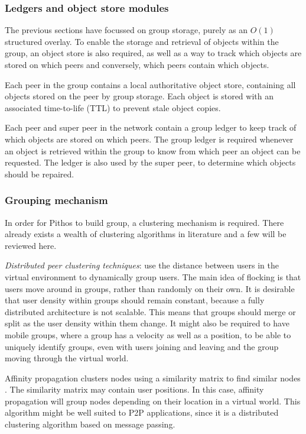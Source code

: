 \subsubsection{Ledgers and object store modules}

The previous sections have focussed on group storage, purely as an $O(1)$ structured overlay. To enable the storage and retrieval of objects within the group, an object store is also required, as well as a way to track which objects are stored on which peers and conversely, which peers contain which objects.

Each peer in the group contains a local authoritative object store, containing all objects stored on the peer by group storage. Each object is stored with an associated time-to-life (TTL) to prevent stale object copies.

Each peer and super peer in the network contain a group ledger to keep track of which objects are stored on which peers. The group ledger is required whenever an object is retrieved within the group to know from which peer an object can be requested. The ledger is also used by the super peer, to determine which objects should be repaired.

\subsubsection{Grouping mechanism}
\label{grouping_design}

In order for Pithos to build group, a clustering mechanism is required. There already exists a wealth of clustering algorithms in literature and a few will be reviewed here.

\emph{Distributed peer clustering techniques}: use the distance between users in the virtual environment to dynamically group users. The main idea of flocking is that users move around in groups, rather than randomly on their own. It is desirable that user density within groups should remain constant, because a fully distributed architecture is not scalable. This means that groups should merge or split as the user density within them change. It might also be required to have mobile groups, where a group has a velocity as well as a position, to be able to uniquely identify groups, even with users joining and leaving and the group moving through the virtual world.

Affinity propagation clusters nodes using a similarity matrix to find similar nodes \cite{affinity_propagation}. The similarity matrix may contain user positions. In this case, affinity propagation will group nodes depending on their location in a virtual world. This algorithm might be well suited to P2P applications, since it is a distributed clustering algorithm based on message passing.


